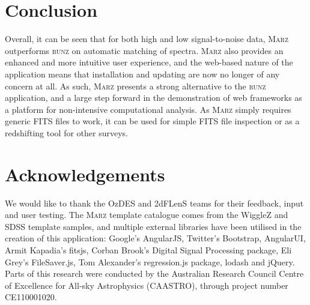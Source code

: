 \documentclass[iop]{emulateapj}
\newcommand{\runz}{\textsc{runz}}
\newcommand{\marz}{\textsc{Marz}}
\begin{document}
\section{Conclusion}

Overall, it can be seen that for both high and low signal-to-noise data, \marz{} outperforms \runz{} on automatic matching of spectra. \marz{} also provides an enhanced and more intuitive user experience, and the web-based nature of the application means that installation and updating are now no longer of any concern at all. As such, \marz{} presents a strong alternative to the \runz{} application, and a large step forward in the demonstration of web frameworks as a platform for non-intensive computational analysis. As \marz{} simply requires generic FITS files to work, it can be used for simple FITS file inspection or as a redshifting tool for other surveys.\\

\section*{Acknowledgements}
We would like to thank the OzDES and 2dFLenS teams for their feedback, input and user testing. The \marz{} template catalogue comes from the WiggleZ and SDSS template samples, and multiple external libraries have been utilised in the creation of this application: Google's AngularJS, Twitter's Bootstrap, AngularUI, Armit Kapadia's fitsjs, Corban Brook's Digital Signal Processing package, Eli Grey's FileSaver.js, Tom Alexander's regression.js package, lodash and jQuery. Parts of this research were conducted by the Australian Research Council Centre of Excellence for All-sky Astrophysics (CAASTRO), through project number CE110001020.



\end{document}

